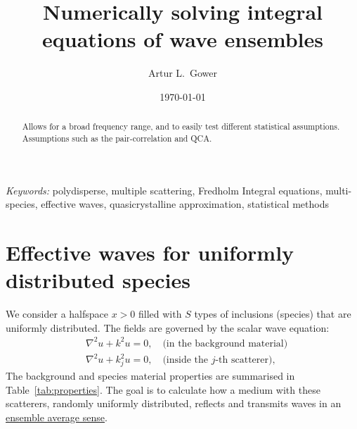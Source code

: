 \documentclass[12pt, a4paper]{article}
\begin{document}
\title{Numerically solving integral equations of wave ensembles}


\author[$\dagger$]{Artur L.\ Gower}


\date{\today}
\maketitle

\begin{abstract}
Allows for a broad frequency range, and to easily test different statistical assumptions. Assumptions such as the pair-correlation and QCA.
\end{abstract}

\noindent
{\textit{Keywords:} polydisperse, multiple scattering, Fredholm Integral equations, multi-species, effective waves, quasicrystalline approximation, statistical methods}


\section{Effective waves for uniformly distributed species}
\label{sec:results}

We consider a halfspace $x>0$ filled with $S$ types of inclusions (species) that are uniformly distributed. The fields are governed by the scalar wave equation:
\begin{align}
  &\nabla^2 u + k^2 u = 0, \quad \text{(in the background material)} \\
  &\nabla^2 u + k^2_j u = 0, \quad \text{(inside the $j$-th scatterer)},
\end{align}
 The background and species material properties are summarised in Table~\ref{tab:properties}.
The goal is to calculate how a medium with these scatterers, randomly uniformly distributed, reflects and transmits waves in an
\href{https://en.wikipedia.org/wiki/Ensemble_average_(statistical_mechanics)}{ensemble average sense}.
\end{document}
